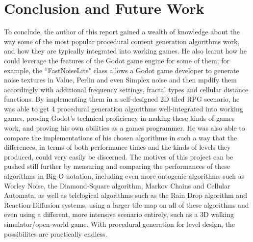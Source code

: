 \chapter{Conclusion and Future Work} \label{Conclusion}


To conclude, the author of this report gained a wealth of knowledge about the way some of the most popular procedural content generation algorithms work, and how they are typically integrated into working games. He also learnt how he could leverage the features of the Godot game engine for some of them; for example, the ``FastNoiseLite" class allows a Godot game developer to generate noise textures in Value, Perlin and even Simplex noise and then mpdify them accordingly with additional frequency settings, fractal types and cellular distance functions. By implementing them in a self-designed 2D tiled RPG scenario, he was able to get 4 procedural generation algorithms well-integrated into working games, proving Godot's technical proficiency in making these kinds of games work, and proving his own abilities as a games programmer. He was also able to compare the implementations of his chosen algorithms in such a way that the differences, in terms of both performance times and the kinds of levels they produced, could very easily be discerned. The motives of this project can be pushed still further by measuring and comparing the performances of these algorithms in Big-O notation, including even more ontogenic algorithms such as Worley Noise, the Diamond-Square algorithm, Markov Chains and Cellular Automata, as well as telelogical algorithms such as the Rain Drop algorithm and Reaction-Diffusion systems, using a larger tile map on all of these algorithms and even using a different, more intensive scenario entirely, such as a 3D walking simulator/open-world game. With procedural generation for level design, the possibilites are practically endless.